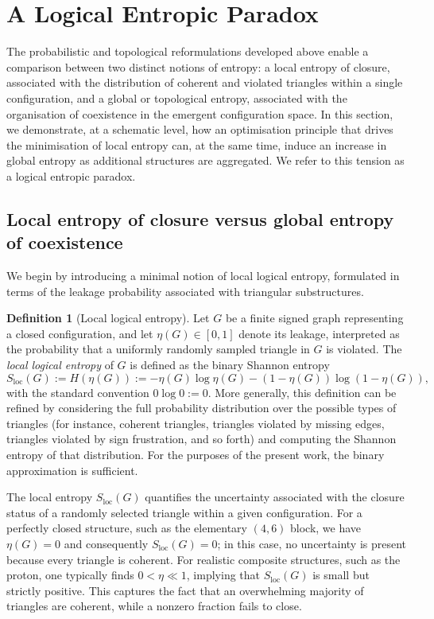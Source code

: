\documentclass[11pt,a4paper]{article}
\theoremstyle{definition}
\newtheorem{definition}[theorem]{Definition}
\newcommand{\etaL}{\eta} %
\begin{document}
\section{A Logical Entropic Paradox}

The probabilistic and topological reformulations developed above enable a comparison between two distinct notions of entropy: a local entropy of closure, associated with the distribution of coherent and violated triangles within a single configuration, and a global or topological entropy, associated with the organisation of coexistence in the emergent configuration space. In this section, we demonstrate, at a schematic level, how an optimisation principle that drives the minimisation of local entropy can, at the same time, induce an increase in global entropy as additional structures are aggregated. We refer to this tension as a logical entropic paradox.

\subsection{Local entropy of closure versus global entropy of coexistence}

We begin by introducing a minimal notion of local logical entropy, formulated in terms of the leakage probability associated with triangular substructures.

\begin{definition}[Local logical entropy]
Let \(G\) be a finite signed graph representing a closed configuration, and let \(\eta(G) \in [0,1]\) denote its leakage, interpreted as the probability that a uniformly randomly sampled triangle in \(G\) is violated. The \emph{local logical entropy} of \(G\) is defined as the binary Shannon entropy
\[
 S_{\mathrm{loc}}(G) := H(\eta(G)) := - \eta(G) \log \eta(G) - (1 - \eta(G)) \log (1 - \eta(G)),
\]
with the standard convention \(0 \log 0 := 0\). More generally, this definition can be refined by considering the full probability distribution over the possible types of triangles (for instance, coherent triangles, triangles violated by missing edges, triangles violated by sign frustration, and so forth) and computing the Shannon entropy of that distribution. For the purposes of the present work, the binary approximation is sufficient.
\end{definition}

The local entropy \(S_{\mathrm{loc}}(G)\) quantifies the uncertainty associated with the closure status of a randomly selected triangle within a given configuration. For a perfectly closed structure, such as the elementary \((4,6)\) block, we have \(\eta(G) = 0\) and consequently \(S_{\mathrm{loc}}(G) = 0\); in this case, no uncertainty is present because every triangle is coherent. For realistic composite structures, such as the proton, one typically finds \(0 < \etaL \ll 1\), implying that \(S_{\mathrm{loc}}(G)\) is small but strictly positive. This captures the fact that an overwhelming majority of triangles are coherent, while a nonzero fraction fails to close.
\end{document}

